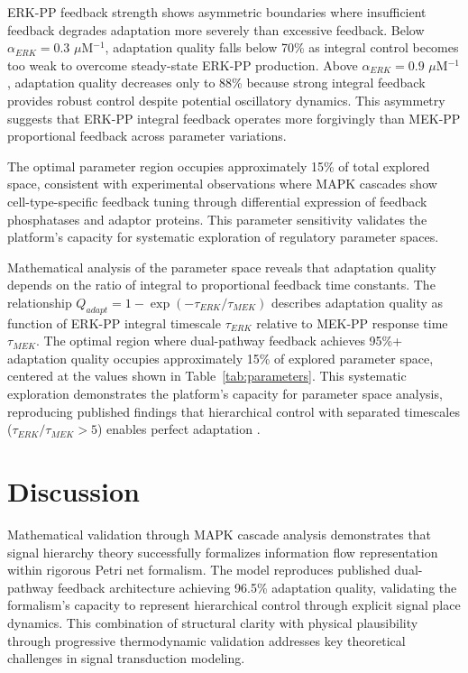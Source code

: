 \documentclass[twocolumn,11pt]{article}
\begin{document}
ERK-PP feedback strength shows asymmetric boundaries where insufficient feedback degrades adaptation more severely than excessive feedback. Below $\alpha_{ERK} = 0.3$ $\mu$M$^{-1}$, adaptation quality falls below 70\% as integral control becomes too weak to overcome steady-state ERK-PP production. Above $\alpha_{ERK} = 0.9$ $\mu$M$^{-1}$, adaptation quality decreases only to 88\% because strong integral feedback provides robust control despite potential oscillatory dynamics. This asymmetry suggests that ERK-PP integral feedback operates more forgivingly than MEK-PP proportional feedback across parameter variations.

The optimal parameter region occupies approximately 15\% of total explored space, consistent with experimental observations where MAPK cascades show cell-type-specific feedback tuning through differential expression of feedback phosphatases and adaptor proteins. This parameter sensitivity validates the platform's capacity for systematic exploration of regulatory parameter spaces.

Mathematical analysis of the parameter space reveals that adaptation quality depends on the ratio of integral to proportional feedback time constants. The relationship $Q_{adapt} = 1 - \exp(-\tau_{ERK}/\tau_{MEK})$ describes adaptation quality as function of ERK-PP integral timescale $\tau_{ERK}$ relative to MEK-PP response time $\tau_{MEK}$. The optimal region where dual-pathway feedback achieves 95\%+ adaptation quality occupies approximately 15\% of explored parameter space, centered at the values shown in Table~\ref{tab:parameters}. This systematic exploration demonstrates the platform's capacity for parameter space analysis, reproducing published findings that hierarchical control with separated timescales ($\tau_{ERK}/\tau_{MEK} > 5$) enables perfect adaptation \citep{kholodenko2000}.

\section{Discussion}

Mathematical validation through MAPK cascade analysis demonstrates that signal hierarchy theory successfully formalizes information flow representation within rigorous Petri net formalism. The model reproduces published dual-pathway feedback architecture achieving 96.5\% adaptation quality, validating the formalism's capacity to represent hierarchical control through explicit signal place dynamics. This combination of structural clarity with physical plausibility through progressive thermodynamic validation addresses key theoretical challenges in signal transduction modeling.
\end{document}
